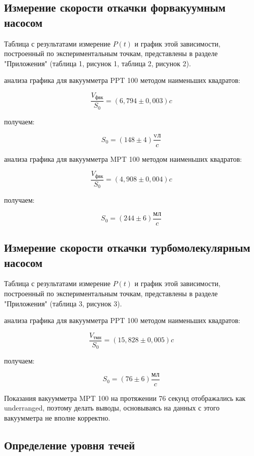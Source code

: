 \documentclass[15pt,a5paper,reqno]{article}
\begin{document}
    \subsection{Измерение скорости откачки форвакуумным насосом}
    
    Таблица с результатами измерение $P(t)$ и график этой зависимости, построенный по экспериментальным точкам, представлены в разделе "Приложения" (таблица 1, рисунок 1, таблица 2, рисунок 2).
    
     анализа графика для вакуумметра PPT 100 методом наименьших квадратов:
    
    \[\frac{V_{\text{фвк}}}{S_0} = (6,794 \pm 0,003)c\]
    
     получаем:
    
    \[S_0 = (148 \pm 4)\frac{\text{vл}}{c}\]
    
     анализа графика для вакуумметра MPT 100 методом наименьших квадратов:
    
    \[\frac{V_{\text{фвк}}}{S_0} = (4,908 \pm 0,004)c\]
    
     получаем:
    
    \[S_0 = (244 \pm 6)\frac{\text{мл}}{c}\]
    
    \subsection{Измерение скорости откачки турбомолекулярным насосом}
    
    Таблица с результатами измерение $P(t)$ и график этой зависимости, построенный по экспериментальным точкам, представлены в разделе "Приложения" (таблица 3, рисунок 3).
    
     анализа графика для вакуумметра PPT 100 методом наименьших квадратов:
    
    \[\frac{V_{\text{тмн}}}{S_0} = (15,828 \pm 0,005)c\]
    
     получаем:
    
    \[S_0 = (76 \pm 6)\frac{\text{мл}}{c}\]
    
    Показания вакуумметра MPT 100 на протяжении 76 секунд отображались как underranged, поэтому делать выводы, основываясь на данных с этого вакуумметра не вполне корректно.
    
    \subsection{Определение уровня течей}
    
\end{document}
